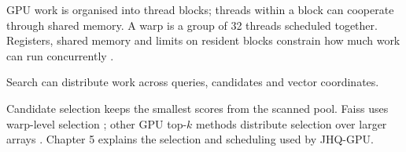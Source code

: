 GPU work is organised into thread blocks; threads within a block can
cooperate through shared memory. A warp is a group of 32 threads scheduled
together. Registers, shared memory and limits on resident blocks constrain
how much work can run concurrently \cite{cuda_programming_guide}.

Search can distribute work across queries, candidates and vector coordinates.

Candidate selection keeps the smallest scores from the scanned pool.
Faiss uses warp-level selection \cite{johnson_gpu}; other GPU top-$k$
methods distribute selection over larger arrays \cite{gpu_topk}.
Chapter 5 explains the selection and scheduling used by JHQ-GPU.

